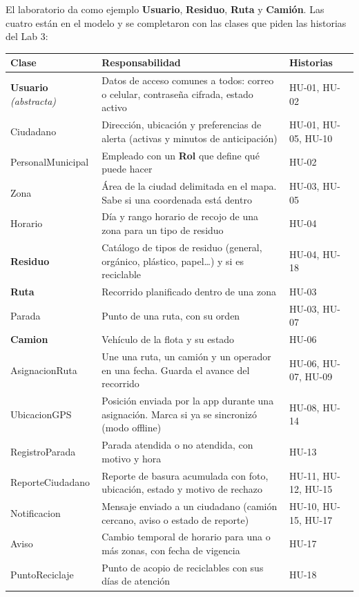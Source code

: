 \documentclass[11pt,a4paper]{article}
\begin{document}
El laboratorio da como ejemplo \textbf{Usuario}, \textbf{Residuo}, \textbf{Ruta} y \textbf{Camión}. Las cuatro están en el modelo y se completaron con las clases que piden las historias del Lab 3:

{\small
\begin{longtable}{L{3.4cm} L{9.4cm} L{2.6cm}}
\toprule
\textbf{Clase} & \textbf{Responsabilidad} & \textbf{Historias} \\
\midrule
\endhead
\textbf{Usuario} \textit{(abstracta)} & Datos de acceso comunes a todos: correo o celular, contraseña cifrada, estado activo & HU-01, HU-02 \\
Ciudadano & Dirección, ubicación y preferencias de alerta (activas y minutos de anticipación) & HU-01, HU-05, HU-10 \\
PersonalMunicipal & Empleado con un \textbf{Rol} que define qué puede hacer & HU-02 \\
Zona & Área de la ciudad delimitada en el mapa. Sabe si una coordenada está dentro & HU-03, HU-05 \\
Horario & Día y rango horario de recojo de una zona para un tipo de residuo & HU-04 \\
\textbf{Residuo} & Catálogo de tipos de residuo (general, orgánico, plástico, papel\ldots) y si es reciclable & HU-04, HU-18 \\
\textbf{Ruta} & Recorrido planificado dentro de una zona & HU-03 \\
Parada & Punto de una ruta, con su orden & HU-03, HU-07 \\
\textbf{Camion} & Vehículo de la flota y su estado & HU-06 \\
AsignacionRuta & Une una ruta, un camión y un operador en una fecha. Guarda el avance del recorrido & HU-06, HU-07, HU-09 \\
UbicacionGPS & Posición enviada por la app durante una asignación. Marca si ya se sincronizó (modo offline) & HU-08, HU-14 \\
RegistroParada & Parada atendida o no atendida, con motivo y hora & HU-13 \\
ReporteCiudadano & Reporte de basura acumulada con foto, ubicación, estado y motivo de rechazo & HU-11, HU-12, HU-15 \\
Notificacion & Mensaje enviado a un ciudadano (camión cercano, aviso o estado de reporte) & HU-10, HU-15, HU-17 \\
Aviso & Cambio temporal de horario para una o más zonas, con fecha de vigencia & HU-17 \\
PuntoReciclaje & Punto de acopio de reciclables con sus días de atención & HU-18 \\
\bottomrule
\end{longtable}
}
\end{document}
